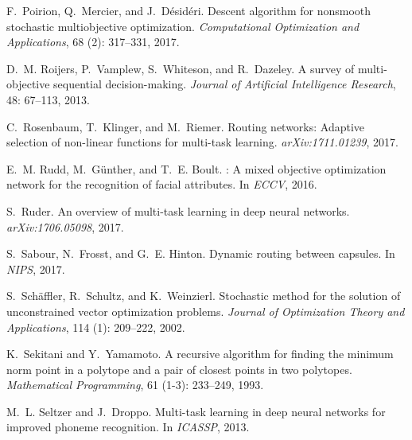 \documentclass{article}
\begin{document}
{\begin{thebibliography}{60}
F.~Poirion, Q.~Mercier, and J.~D{\'{e}}sid{\'{e}}ri.
\newblock Descent algorithm for nonsmooth stochastic multiobjective
  optimization.
\newblock \emph{Computational Optimization and Applications}, 68
  (2): 317--331, 2017.

D.~M. Roijers, P.~Vamplew, S.~Whiteson, and R.~Dazeley.
\newblock A survey of multi-objective sequential decision-making.
\newblock \emph{Journal of Artificial Intelligence Research}, 48:
  67--113, 2013.

C.~Rosenbaum, T.~Klinger, and M.~Riemer.
\newblock Routing networks: Adaptive selection of non-linear functions for
  multi-task learning.
\newblock \emph{arXiv:1711.01239}, 2017.

E.~M. Rudd, M.~G{\"u}nther, and T.~E. Boult.
: A mixed objective optimization network for the recognition of
  facial attributes.
\newblock In \emph{ECCV}, 2016.

S.~Ruder.
\newblock An overview of multi-task learning in deep neural networks.
\newblock \emph{arXiv:1706.05098}, 2017.

S.~Sabour, N.~Frosst, and G.~E. Hinton.
\newblock Dynamic routing between capsules.
\newblock In \emph{{NIPS}}, 2017.

S.~Sch{\"a}ffler, R.~Schultz, and K.~Weinzierl.
\newblock Stochastic method for the solution of unconstrained vector
  optimization problems.
\newblock \emph{Journal of Optimization Theory and Applications}, 114
  (1): 209--222, 2002.

K.~Sekitani and Y.~Yamamoto.
\newblock A recursive algorithm for finding the minimum norm point in a
  polytope and a pair of closest points in two polytopes.
\newblock \emph{Mathematical Programming}, 61 (1-3):
  233--249, 1993.

M.~L. Seltzer and J.~Droppo.
\newblock Multi-task learning in deep neural networks for improved phoneme
  recognition.
\newblock In \emph{ICASSP}, 2013.


\end{thebibliography}}
\end{document}
